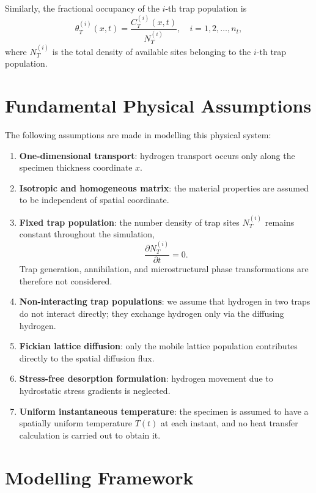 \documentclass[a4paper,12pt,oneside]{report}
\begin{document}
Similarly, the fractional occupancy of the $i$-th trap population is
\begin{equation}
\theta^{(i)}_T(x, t) = \frac{C^{(i)}_T(x, t)}{N^{(i)}_T}, \quad i = 1, 2, \dots , n_t,
\label{eq:ch3_thetaT}
\end{equation}
where $N^{(i)}_T$ is the total density of available sites belonging to the $i$-th trap population.

\section{Fundamental Physical Assumptions}

The following assumptions are made in modelling this physical system:

\begin{enumerate}
    \item \textbf{One-dimensional transport}: hydrogen transport occurs only along the specimen thickness coordinate $x$.
    \item \textbf{Isotropic and homogeneous matrix}: the material properties are assumed to be independent of spatial coordinate.
    \item \textbf{Fixed trap population}: the number density of trap sites $N^{(i)}_T$ remains constant throughout the simulation,
    \begin{equation}
    \frac{\partial N^{(i)}_T}{\partial t} = 0.
    \label{eq:ch3_NT_const}
    \end{equation}
    Trap generation, annihilation, and microstructural phase transformations are therefore not considered.
    \item \textbf{Non-interacting trap populations}: we assume that hydrogen in two traps do not interact directly; they exchange hydrogen only via the diffusing hydrogen.
    \item \textbf{Fickian lattice diffusion}: only the mobile lattice population contributes directly to the spatial diffusion flux.
    \item \textbf{Stress-free desorption formulation}: hydrogen movement due to hydrostatic stress gradients is neglected.
    \item \textbf{Uniform instantaneous temperature}: the specimen is assumed to have a spatially uniform temperature $T(t)$ at each instant, and no heat transfer calculation is carried out to obtain it.
\end{enumerate}

\section{Modelling Framework}
\end{document}

